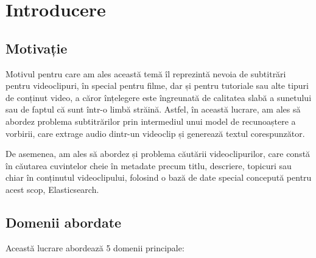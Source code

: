 \chapter{Introducere}

\section{Motivație}

Motivul pentru care am ales această temă îl reprezintă nevoia de subtitrări pentru videoclipuri, în special pentru filme, 
dar și pentru tutoriale sau alte tipuri de conținut video, a căror înțelegere este îngreunată de calitatea slabă a sunetului 
sau de faptul că sunt într-o limbă străină. Astfel, în această lucrare, am ales să abordez problema subtitrărilor prin
intermediul unui model de recunoaștere a vorbirii, care extrage audio dintr-un videoclip și generează textul corespunzător.
\par
De asemenea, am ales să abordez și problema căutării videoclipurilor, care constă în căutarea cuvintelor cheie în metadate
precum titlu, descriere, topicuri sau chiar în conținutul videoclipului, folosind o bază de date special concepută pentru
acest scop, Elasticsearch. \cite{elasticsearch}


\section{Domenii abordate}

Această lucrare abordează 5 domenii principale:

